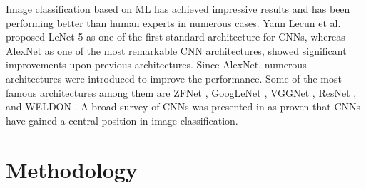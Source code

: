 \documentclass{article}
\begin{document}
Image classification based on ML has achieved impressive results and has been performing better than human experts in numerous cases. 
Yann Lecun et al. \cite{CNN_first_1989} proposed LeNet-5 as one of the first standard architecture for CNNs, whereas AlexNet as one of the most remarkable CNN architectures, showed significant improvements upon previous architectures. 
Since AlexNet, numerous architectures were introduced to improve the performance. Some of the most famous architectures among them are ZFNet \cite{ZFNet_2013}, GoogLeNet \cite{GoogLeNet_2014}, VGGNet \cite{VGGNet_2014}, ResNet \cite{ResNet_2015}, and WELDON \cite{durand_weldon:_2016}. A broad survey of CNNs was presented in \cite{recent_advance_cnn_2015} as proven that CNNs have gained a central position in image classification. 

\section{Methodology}\label{Methodology}
\end{document}
